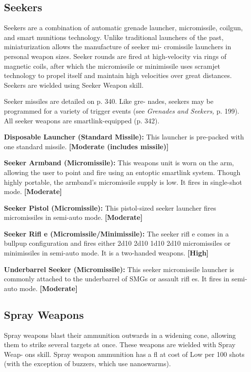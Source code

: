 \subsection{Seekers}

Seekers are a combination of automatic grenade 
launcher, micromissile, coilgun, and smart munitions 
technology. Unlike traditional launchers of the past, 
miniaturization allows the manufacture of seeker mi-
cromissile launchers in personal weapon sizes. Seeker 
rounds are fired at high-velocity via rings of magnetic 
coils, after which the micromissile or minimissile uses 
scramjet technology to propel itself and maintain high 
velocities over great distances. Seekers are wielded 
using Seeker Weapon skill.

Seeker missiles are detailed on p. 340. Like gre-
nades, seekers may be programmed for a variety of 
trigger events (see \textit{Grenades and Seekers,} p. 199). All 
seeker weapons are smartlink-equipped (p. 342).

\textbf{Disposable Launcher (Standard Missile):} This 
launcher is pre-packed with one standard missile. 
\textbf{[Moderate (includes missile)]}

\textbf{Seeker Armband (Micromissile):} This weapons unit 
is worn on the arm, allowing the user to point and 
fire using an entoptic smartlink system. Though highly 
portable, the armband's micromissile supply is low. It 
fires in single-shot mode. \textbf{[Moderate]}

\textbf{Seeker Pistol (Micromissile):} This pistol-sized 
seeker launcher fires micromissiles in semi-auto 
mode. \textbf{[Moderate]}

\textbf{Seeker Rifl e (Micromissile/Minimissile):} The seeker 
rifl e comes in a bullpup configuration and fires either 
2d10
2d10
1d10
2d10
micromissiles or minimissiles in semi-auto mode. It is 
a two-handed weapons. \textbf{[High]}

\textbf{Underbarrel Seeker (Micromissile):} This seeker 
micromissile launcher is commonly attached to the 
underbarrel of SMGs or assault rifl es. It fires in semi-
auto mode. \textbf{[Moderate]}

\subsection{Spray Weapons}

Spray weapons blast their ammunition outwards in a 
widening cone, allowing them to strike several targets 
at once. These weapons are wielded with Spray Weap-
ons skill. Spray weapon ammunition has a fl at cost 
of Low per 100 shots (with the exception of buzzers, 
which use nanoswarms).

